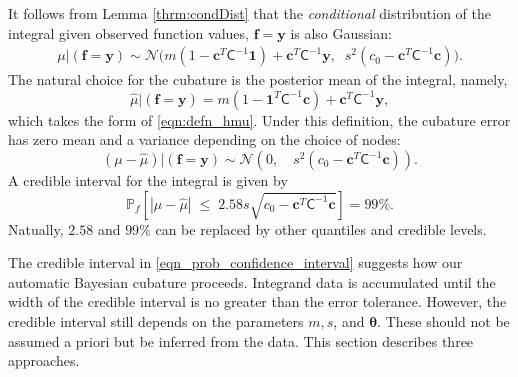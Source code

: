 \documentclass{iitthesis}          %
\newcommand{\bm}[1]{\boldsymbol{#1}}
\newcommand{\vtheta}{{\bm{\theta}}}
\newcommand{\vc}{\bm{c}}
\newcommand{\vf}{\bm{f}}
\newcommand{\vy}{\bm{y}}
\newcommand{\vone}{\bm{1}}
\newcommand{\mC}{\mathsf{C}}
\newcommand{\calN}{\mathcal{N}}
\newcommand{\hmu}{\widehat{\mu}}
\begin{document}
It follows from Lemma \ref{thrm:condDist} that the \emph{conditional} distribution of the integral given observed function values, $\vf = \vy$ is also Gaussian:
\begin{align} \label{eqn:condInteg}
\mu | (\vf = \vy) \sim \calN \bigl(m (1 - \vc^T \mC^{-1} \vone)  + \vc^T \mC^{-1} \vy, \;\;
s^2(c_0  -\vc ^T \mC^{-1} \vc) \bigr).
\end{align}
The natural choice for  the cubature is the posterior mean of the integral, namely, 
\begin{equation}
\label{eqn:BayesCub}
\widehat{\mu}  \vert ( \vf = \vy)
= m(1 - \vone^T  \mC^{-1}\vc )
+ \vc^T \mC^{-1} \vy,
\end{equation}
which takes the form of \eqref{eqn:defn_hmu}.
Under this definition, the cubature error has zero mean and a variance depending on the choice of nodes:
\begin{equation*}
(\mu-\hmu) | (\vf = \vy)
 \sim  \calN 
\left(
0, \quad
s^2 (c_0 - \vc^T\mC^{-1}\vc) 
\right).
\end{equation*}
A credible interval for the integral is given by 
\begin{equation}
\label{eqn_prob_confidence_interval}
\mathbb{P}_f \left[
|\mu-\hmu| \; \leq \; 2.58 s \sqrt{c_0 - \vc^T\mC^{-1}\vc } 
\right] = 99\%.
\end{equation}
Natually, $2.58$ and $99\%$ can be replaced by other quantiles and credible levels.


\label{sec:stopping_criteria}
The credible interval in \eqref{eqn_prob_confidence_interval} suggests how our automatic Bayesian cubature proceeds.  Integrand data is accumulated until the width of the credible interval is no greater than the error tolerance.  However, the credible interval still depends on the parameters $m, s$, and $\vtheta$.  These should not be assumed a priori but be inferred from the data.  This section describes three approaches.
\end{document}

